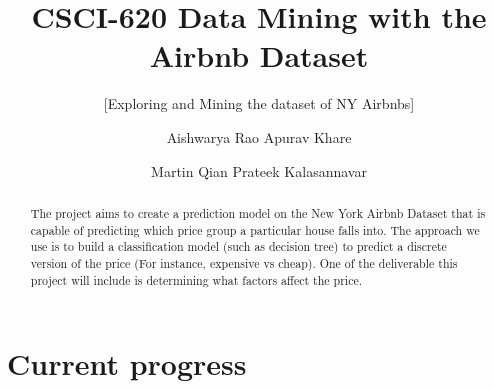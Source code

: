 \documentclass{sig-alternate}
\begin{document}
	\title{CSCI-620 Data Mining with the Airbnb Dataset}
	\subtitle{[Exploring and Mining the dataset of NY Airbnbs]}
	
	\author
	{
		\alignauthor
		Aishwarya Rao
		\alignauthor
		Apurav Khare
		\and
		\alignauthor
		Martin Qian
		\alignauthor
		Prateek Kalasannavar
	}
	
	\maketitle
	\begin{abstract}
		
		The project aims to create a prediction model on the New York Airbnb Dataset that is capable of predicting which price group a particular house falls into. The approach we use is to build a classification model (such as decision tree) to predict a discrete version of the price (For instance, expensive vs cheap). One of the deliverable this project will include is determining what factors affect the price.   
		
	\end{abstract}
	
	\section{Current progress}
	
\end{document}
